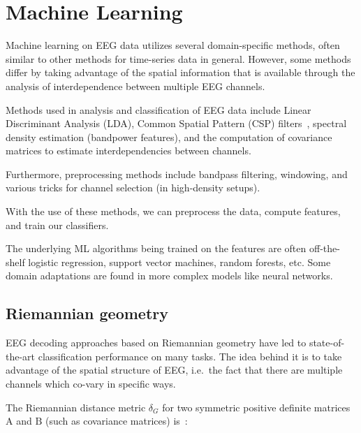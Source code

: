 \section{Machine Learning}

    Machine learning on EEG data utilizes several domain-specific methods, often similar to other methods for time-series data in general. However, some methods differ by taking advantage of the spatial information that is available through the analysis of interdependence between multiple EEG channels.

    Methods used in analysis and classification of EEG data include Linear Discriminant Analysis (LDA), Common Spatial Pattern (CSP) filters~\cite{barachant_common_2010}, spectral density estimation (bandpower features), and the computation of covariance matrices to estimate interdependencies between channels. 

    Furthermore, preprocessing methods include bandpass filtering, windowing, and various tricks for channel selection (in high-density setups). 

    With the use of these methods, we can preprocess the data, compute features, and train our classifiers.

    The underlying ML algorithms being trained on the features are often off-the-shelf logistic regression, support vector machines, random forests, etc. Some domain adaptations are found in more complex models like neural networks.



    \subsection{Riemannian geometry}\label{section:riemannian-theory}


        EEG decoding approaches based on Riemannian geometry have led to state-of-the-art classification performance on many tasks. The idea behind it is to take advantage of the spatial structure of EEG, i.e.\ the fact that there are multiple channels which co-vary in specific ways.

        The Riemannian distance metric $\delta_G$ for two symmetric positive definite matrices $\mathrm{A}$ and $\mathrm{B}$ (such as covariance matrices) is~\cite{grafarend_metric_2003}:


